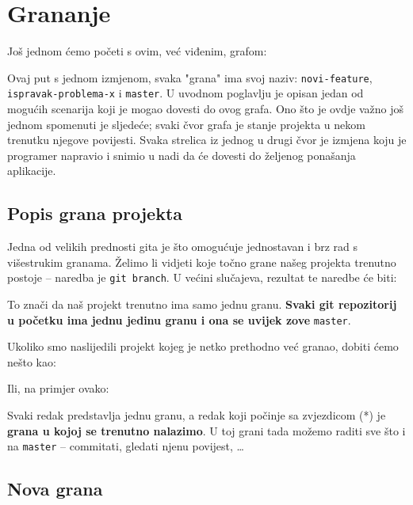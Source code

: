 \chapter*{Grananje}

Još jednom ćemo početi s ovim, već viđenim, grafom:



Ovaj put s jednom izmjenom, svaka "grana" ima svoj naziv: \verb+novi-feature+, \\ \verb+ispravak-problema-x+ i \verb+master+.
U uvodnom poglavlju je opisan jedan od mogućih scenarija koji je mogao dovesti do ovog grafa.
Ono što je ovdje važno još jednom spomenuti je sljedeće; svaki čvor grafa je stanje projekta u nekom trenutku njegove povijesti. 
Svaka strelica iz jednog u drugi čvor je izmjena koju je programer napravio i snimio u nadi da će dovesti do željenog ponašanja aplikacije.

\section*{Popis grana projekta}

Jedna od velikih prednosti gita je što omogućuje jednostavan i brz rad s višestrukim granama.
Želimo li vidjeti koje točno grane našeg projekta trenutno postoje -- naredba je \verb+git branch+.
U većini slučajeva, rezultat te naredbe će biti:



To znači da naš projekt trenutno ima samo jednu granu.
\textbf{Svaki git repozitorij u početku ima jednu jedinu granu i ona se uvijek zove} \verb+master+.

Ukoliko smo naslijedili projekt kojeg je netko prethodno već granao, dobiti ćemo nešto kao:



Ili, na primjer ovako:



Svaki redak predstavlja jednu granu, a redak koji počinje sa zvjezdicom (*) je \textbf{grana u kojoj se trenutno nalazimo}.
U toj grani tada možemo raditi sve što i na \verb+master+ -- commitati, gledati njenu povijest, \dots

\section*{Nova grana}

